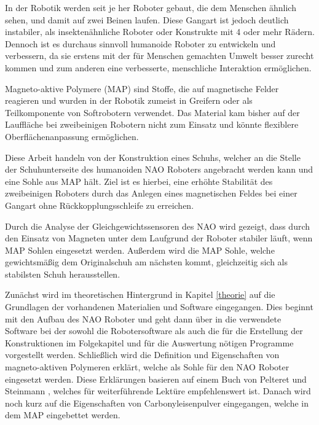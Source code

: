 In der Robotik werden seit je her Roboter gebaut, die dem Menschen ähnlich sehen, und damit auf zwei Beinen laufen. Diese Gangart ist jedoch deutlich instabiler, als insektenähnliche Roboter oder Konstrukte mit 4 oder mehr Rädern. Dennoch ist es durchaus sinnvoll humanoide Roboter zu entwickeln und verbessern, da sie erstens mit der für Menschen gemachten Umwelt besser zurecht kommen und zum anderen eine verbesserte, menschliche Interaktion ermöglichen. 

Magneto-aktive Polymere (MAP) sind Stoffe, die auf magnetische Felder reagieren und wurden in der Robotik zumeist in Greifern oder als Teilkomponente von Softrobotern verwendet. Das Material kam bisher auf der Lauffläche bei zweibeinigen Robotern nicht zum Einsatz und könnte flexiblere Oberflächenanpassung ermöglichen. 

Diese Arbeit handeln von der Konstruktion eines Schuhs, welcher an die Stelle der Schuhunterseite des humanoiden NAO Roboters angebracht werden kann und eine Sohle aus MAP hält. Ziel ist es hierbei, eine erhöhte Stabilität des zweibeinigen Roboters durch das Anlegen eines magnetischen Feldes bei einer Gangart ohne Rückkopplungsschleife zu erreichen. 

Durch die Analyse der Gleichgewichtssensoren des NAO wird gezeigt, dass durch den Einsatz von Magneten unter dem Laufgrund der Roboter stabiler läuft, wenn MAP Sohlen eingesetzt werden. Außerdem wird die MAP Sohle, welche gewichtsmäßig dem Originalschuh am nächsten kommt, gleichzeitig sich als stabilsten Schuh herausstellen. 

Zunächst wird im theoretischen Hintergrund in Kapitel \ref{theorie} auf die Grundlagen der vorhandenen Materialien und Software eingegangen. Dies beginnt mit den Aufbau des NAO Roboter und geht dann über in die verwendete Software bei der sowohl die Robotersoftware als auch die für die Erstellung der Konstruktionen im Folgekapitel und für die Auswertung nötigen Programme vorgestellt werden. Schließlich wird die Definition und Eigenschaften von magneto-aktiven Polymeren erklärt, welche als Sohle für den NAO Roboter eingesetzt werden. Diese Erklärungen basieren auf einem Buch von Pelteret und Steinmann \cite{map2020}, welches für weiterführende Lektüre empfehlenswert ist. Danach wird noch kurz auf die Eigenschaften von Carbonyleisenpulver eingegangen, welche in dem MAP eingebettet werden.

